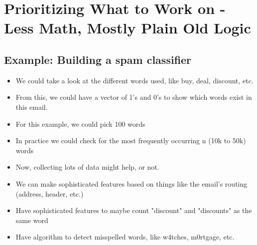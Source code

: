 \documentclass[]{article}
\begin{document}
\section{Prioritizing What to Work on - Less Math, Mostly Plain Old Logic}

	\subsection{Example: Building a spam classifier}
		\begin{itemize}
			\item We could take a look at the different words used, like buy, deal, discount, etc.
			\item From this, we could have a vector of 1's and 0's to show which words exist in this email.
			\item For this example, we could pick 100 words
			\item In practice we could check for the most frequently occurring n (10k to 50k) words
			\item Now, collecting lots of data might help, or not.
			\item We can make sophisticated features based on things like the email's routing (address, header, etc.)
			\item Have sophisticated features to maybe count "discount" and "discounts" as the same word
			\item Have algorithm to detect misspelled words, like w4tches, m0rtgage, etc.
		\end{itemize}
		
\end{document}

